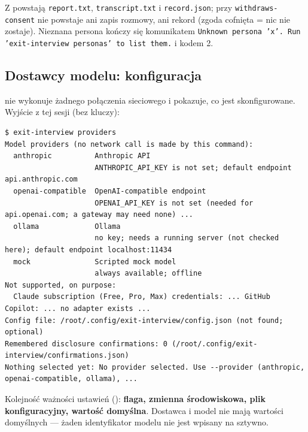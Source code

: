 {Z  powstają \texttt{report.txt}, \texttt{transcript.txt}
i \texttt{record.json}; przy \texttt{withdraws-\allowbreak{}consent} nie powstaje
ani zapis rozmowy, ani rekord (zgoda cofnięta = nic nie zostaje). Nieznana
persona kończy się komunikatem
\texttt{Unknown persona 'x'. Run 'exit-\allowbreak{}interview personas' to list them.} i
kodem 2.


\subsection{Dostawcy modelu: konfiguracja}

 nie wykonuje żadnego połączenia sieciowego i
pokazuje, co jest skonfigurowane. Wyjście z tej sesji (bez kluczy):

\begin{Verbatim}[fontsize=\scriptsize,frame=single,framesep=2mm]
$ exit-interview providers
Model providers (no network call is made by this command):
  anthropic          Anthropic API
                     ANTHROPIC_API_KEY is not set; default endpoint api.anthropic.com
  openai-compatible  OpenAI-compatible endpoint
                     OPENAI_API_KEY is not set (needed for api.openai.com; a gateway may need none) ...
  ollama             Ollama
                     no key; needs a running server (not checked here); default endpoint localhost:11434
  mock               Scripted mock model
                     always available; offline
Not supported, on purpose:
  Claude subscription (Free, Pro, Max) credentials: ... GitHub Copilot: ... no adapter exists ...
Config file: /root/.config/exit-interview/config.json (not found; optional)
Remembered disclosure confirmations: 0 (/root/.config/exit-interview/confirmations.json)
Nothing selected yet: No provider selected. Use --provider (anthropic, openai-compatible, ollama), ...
\end{Verbatim}

Kolejność ważności ustawień ():
\textbf{flaga, zmienna środowiskowa, plik konfiguracyjny, wartość domyślna}.
Dostawca i model nie mają wartości domyślnych --- żaden identyfikator modelu nie
jest wpisany na sztywno.

}
